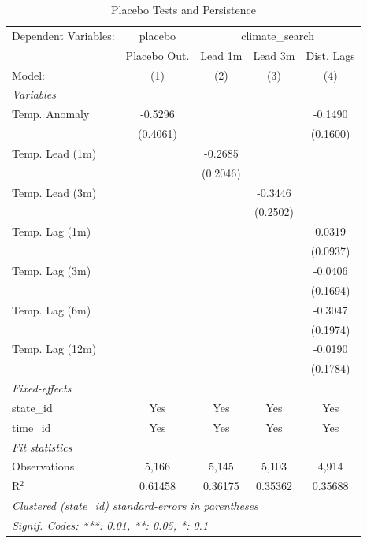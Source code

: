 
\begin{table}[htbp]
   \caption{\label{tab:placebo} Placebo Tests and Persistence}
   \centering
   \begin{tabular}{lcccc}
      \tabularnewline \midrule \midrule
      Dependent Variables: & placebo & \multicolumn{3}{c}{climate\_search}\\
                      & Placebo Out. & Lead 1m  & Lead 3m  & Dist. Lags \\   
      Model:          & (1)          & (2)      & (3)      & (4)\\  
      \midrule
      \emph{Variables}\\
      Temp. Anomaly   & -0.5296      &          &          & -0.1490\\   
                      & (0.4061)     &          &          & (0.1600)\\   
      Temp. Lead (1m) &              & -0.2685  &          &   \\   
                      &              & (0.2046) &          &   \\   
      Temp. Lead (3m) &              &          & -0.3446  &   \\   
                      &              &          & (0.2502) &   \\   
      Temp. Lag (1m)  &              &          &          & 0.0319\\   
                      &              &          &          & (0.0937)\\   
      Temp. Lag (3m)  &              &          &          & -0.0406\\   
                      &              &          &          & (0.1694)\\   
      Temp. Lag (6m)  &              &          &          & -0.3047\\   
                      &              &          &          & (0.1974)\\   
      Temp. Lag (12m) &              &          &          & -0.0190\\   
                      &              &          &          & (0.1784)\\   
      \midrule
      \emph{Fixed-effects}\\
      state\_id       & Yes          & Yes      & Yes      & Yes\\  
      time\_id        & Yes          & Yes      & Yes      & Yes\\  
      \midrule
      \emph{Fit statistics}\\
      Observations    & 5,166        & 5,145    & 5,103    & 4,914\\  
      R$^2$           & 0.61458      & 0.36175  & 0.35362  & 0.35688\\  
      \midrule \midrule
      \multicolumn{5}{l}{\emph{Clustered (state\_id) standard-errors in parentheses}}\\
      \multicolumn{5}{l}{\emph{Signif. Codes: ***: 0.01, **: 0.05, *: 0.1}}\\
   \end{tabular}
   

\end{table}
